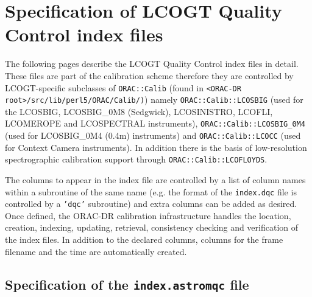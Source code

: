 \documentclass[twoside,11pt,nolof]{starlink}
\begin{document}


\newpage

\section{Specification of LCOGT Quality Control index files\label{ap:qc_indexfiles}}

The following pages describe the LCOGT Quality Control index files in detail.
These files are part of the calibration scheme therefore they are controlled by
LCOGT-specific subclasses of \texttt{ORAC::Calib} (found in \texttt{<ORAC-DR
root>/src/lib/perl5/ORAC/Calib/)}) namely \texttt{ORAC::Calib::LCOSBIG} (used
for the \textsc{LCOSBIG}, \textsc{LCOSBIG\_0M8} (Sedgwick),
\textsc{LCOSINISTRO}, \textsc{LCOFLI}, \textsc{LCOMEROPE} and 
\textsc{LCOSPECTRAL} instruments),  \texttt{ORAC::Calib::LCOSBIG\_0M4} (used for
\textsc{LCOSBIG\_0M4} (0.4m) instruments) and \texttt{ORAC::Calib::LCOCC} (used
for Context Camera instruments). In addition there is the basis of
low-resolution spectrographic calibration support through
\texttt{ORAC::Calib::LCOFLOYDS}.

The columns to appear in the index file are controlled by a list of column names
within a subroutine of the same name (e.g. the format of the \texttt{index.dqc}
file is controlled by a \texttt{'dqc'} subroutine) and extra columns can be
added as desired. Once defined, the ORAC-DR calibration infrastructure handles
the location, creation, indexing, updating, retrieval, consistency checking and
verification of the index files. In addition to the declared columns, columns
for the frame filename and the time are automatically created.

\subsection{Specification of the \texttt{index.astromqc} file\label{ap:index.astromqc}}
\end{document}

